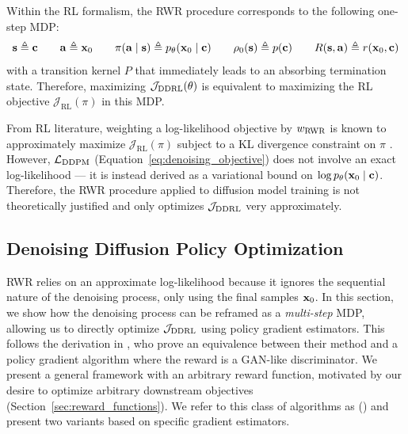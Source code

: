 Within the RL formalism, the RWR procedure corresponds to the following one-step MDP:
\begin{align*}
    \mathbf{s} \triangleq \mathbf{c} \hspace{2em}
    \mathbf{a} \triangleq \mathbf{x}_0 \hspace{2em}
    \pi(\mathbf{a} \mid \mathbf{s}) \triangleq p_\theta(\mathbf{x}_0 \mid \mathbf{c}) \hspace{2em}
    \rho_0(\mathbf{s}) \triangleq p(\mathbf{c}) \hspace{2em}
    R(\mathbf{s}, \mathbf{a}) \triangleq r(\mathbf{x}_0, \mathbf{c})
\end{align*}
with a transition kernel $P$ that immediately leads to an absorbing termination state.
Therefore, maximizing $\mathcal{J}_{\text{DDRL}}(\theta)$ is equivalent to maximizing the RL objective $\mathcal{J}_\text{RL}(\pi)$ in this MDP.

From RL literature, weighting a log-likelihood objective by $w_{\text{RWR}}$ is known to approximately maximize $\mathcal{J}_{\text{RL}}(\pi)$ subject to a KL divergence constraint on $\pi$ \citep{nair2020accelerating}.
However, $\mathcal{L}_{\text{DDPM}}$ (Equation~\ref{eq:denoising_objective}) does not involve an exact log-likelihood --- it is instead derived as a variational bound on $\log p_\theta(\mathbf{x}_0 \mid \mathbf{c})$.
Therefore, the RWR procedure applied to diffusion model training is not theoretically justified and only optimizes $\mathcal{J}_{\text{DDRL}}$ very approximately.

\subsection{Denoising Diffusion Policy Optimization}
\label{sec:ddpo}

RWR relies on an approximate log-likelihood because it ignores the sequential nature of the denoising process, only using the final samples $\mathbf{x}_0$.
In this section, we show how the denoising process can be reframed as a \emph{multi-step} MDP, allowing us to directly optimize $\mathcal{J}_{\text{DDRL}}$ using policy gradient estimators.
This follows the derivation in \citet{fan2023sft}, who prove an equivalence between their method and a policy gradient algorithm where the reward is a GAN-like discriminator.
We present a general framework with an arbitrary reward function, motivated by our desire to optimize arbitrary downstream objectives (Section~\ref{sec:reward_functions}).
We refer to this class of algorithms as \methodfull{} (\methodours) and present two variants based on specific gradient estimators.

